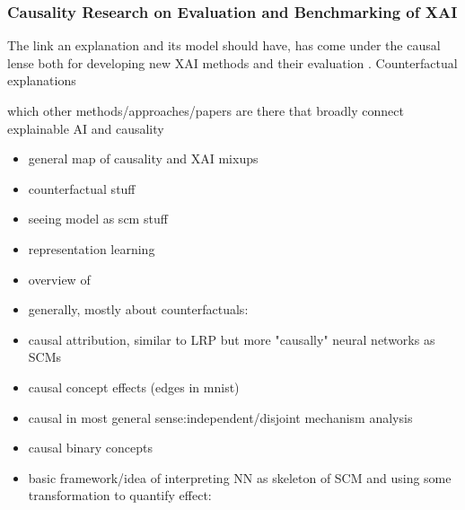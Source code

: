 \subsubsection{Causality Research on Evaluation and Benchmarking of XAI}
The link an explanation and its model should have, has come under the causal lense both for developing new XAI methods and their evaluation  . Counterfactual explanations 

{\color{red} which other methods/approaches/papers are there that broadly connect explainable AI and causality }
\begin{itemize}
      \item general map of causality and XAI mixups
      \item counterfactual stuff
      \item seeing model as scm stuff \cite{Chattopadhyay2019}
      \item representation learning
      \item overview of \cite{Schoelkopf2019}
\end{itemize}

\begin{itemize}
      \item generally, mostly about counterfactuals: \cite{Moraffah2020a}
      \item causal attribution, similar to LRP but more "causally" neural networks as SCMs \cite{Chattopadhyay2019}
      \item causal concept effects (edges in mnist) \cite{Goyal2019}
      \item causal in most general sense:independent/disjoint mechanism analysis \cite{Leemann2023} \cite{Leemann2022}
      \item causal binary concepts \cite{Tran2022}
      \item basic framework/idea of interpreting NN as skeleton of SCM and using some transformation to quantify effect:\cite{Narendra2018}
\end{itemize}




